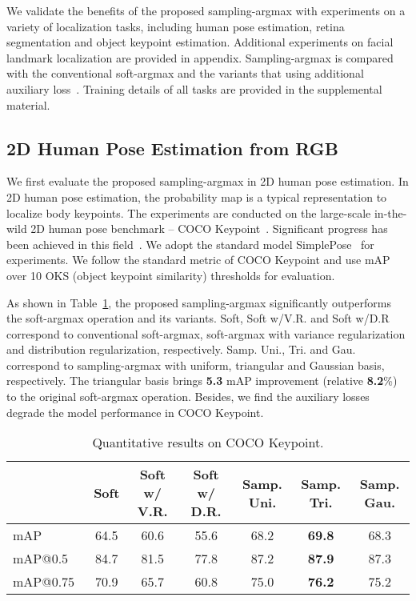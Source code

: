 \documentclass{article}
\begin{document}
We validate the benefits of the proposed sampling-argmax with experiments on a variety of localization tasks, including human pose estimation, retina segmentation and object keypoint estimation. Additional experiments on facial landmark localization are provided in appendix. Sampling-argmax is compared with the conventional soft-argmax and the variants that using additional auxiliary loss~\cite{nibali2018numerical}.
Training details of all tasks are provided in the supplemental material.


\subsection{2D Human Pose Estimation from RGB}
We first evaluate the proposed sampling-argmax in 2D human pose estimation. In 2D human pose estimation, the probability map is a typical representation to localize body keypoints. The experiments are conducted on the large-scale in-the-wild 2D human pose benchmark -- COCO Keypoint~\cite{mscoco}. Significant progress has been achieved in this field~\cite{xiao2018simple,sun2019deep,moon2019posefix,mcnally2020evopose2d}. We adopt the standard model SimplePose~\cite{xiao2018simple} for experiments. We follow the standard metric of COCO Keypoint and use mAP over 10 OKS (object keypoint similarity) thresholds for evaluation.


As shown in Table~\ref{tab:coco}, the proposed sampling-argmax significantly outperforms the soft-argmax operation and its variants. Soft, Soft w/V.R. and Soft w/D.R correspond to conventional soft-argmax, soft-argmax with variance regularization and distribution regularization, respectively. Samp. Uni., Tri. and Gau. correspond to sampling-argmax with uniform, triangular and Gaussian basis, respectively. The triangular basis brings \textbf{5.3} mAP improvement (relative \textbf{8.2}\%) to the original soft-argmax operation. Besides, we find the auxiliary losses degrade the model performance in COCO Keypoint.




\begin{table}[ht]
    \caption{Quantitative results on COCO Keypoint.}
    \label{tab:coco}
    \centering
    \begin{tabular}{lcccccc}
        \toprule
        ~ & Soft & Soft w/ V.R. & Soft w/ D.R. & Samp. Uni. & Samp. Tri. & Samp. Gau. \\
        \midrule
        mAP~ & 64.5 & 60.6 & 55.6 & 68.2 & \textbf{69.8} & 68.3 \\
        mAP@0.5~ & 84.7 & 81.5 & 77.8 & 87.2 & \textbf{87.9} & 87.3 \\
        mAP@0.75~ & 70.9 & 65.7 & 60.8 & 75.0 & \textbf{76.2} & 75.2 \\
        \bottomrule
    \end{tabular}
\end{table}
\end{document}
